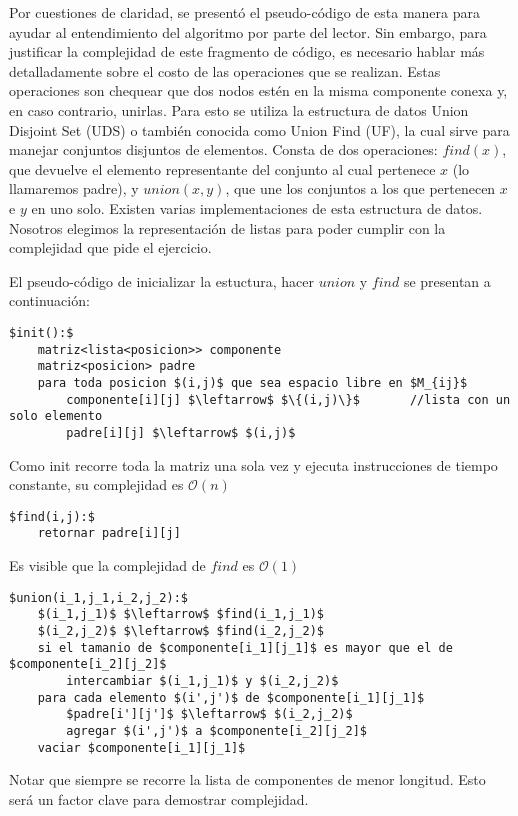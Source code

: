 Por cuestiones de claridad, se presentó el pseudo-código de esta manera para ayudar al entendimiento del algoritmo por parte del lector. Sin embargo, para justificar la complejidad de este fragmento de código, es necesario hablar más detalladamente sobre el costo de las operaciones que se realizan. Estas operaciones son chequear que dos nodos estén en la misma componente conexa y, en caso contrario, unirlas. Para esto se utiliza la estructura de datos Union Disjoint Set (UDS) o también conocida como Union Find (UF), la cual sirve para manejar conjuntos disjuntos de elementos. Consta de dos operaciones: $find(x)$, que devuelve el elemento representante del conjunto al cual pertenece $x$ (lo llamaremos padre), y $union(x,y)$, que une los conjuntos a los que pertenecen $x$ e $y$ en uno solo. Existen varias implementaciones de esta estructura de datos. Nosotros elegimos la representación de listas para poder cumplir con la complejidad que pide el ejercicio.

El pseudo-código de inicializar la estuctura, hacer $union$ y $find$ se presentan a continuación:

\begin{lstlisting}
$init():$
	matriz<lista<posicion>> componente
	matriz<posicion> padre
	para toda posicion $(i,j)$ que sea espacio libre en $M_{ij}$
		componente[i][j] $\leftarrow$ $\{(i,j)\}$		//lista con un solo elemento
		padre[i][j] $\leftarrow$ $(i,j)$
\end{lstlisting}

Como init recorre toda la matriz una sola vez y ejecuta instrucciones de tiempo constante, su complejidad es $\mathcal{O}(n)$

\begin{lstlisting}
$find(i,j):$
	retornar padre[i][j]
\end{lstlisting}

Es visible que la complejidad de $find$ es $\mathcal{O}(1)$

\begin{lstlisting}
$union(i_1,j_1,i_2,j_2):$
	$(i_1,j_1)$ $\leftarrow$ $find(i_1,j_1)$
	$(i_2,j_2)$ $\leftarrow$ $find(i_2,j_2)$
	si el tamanio de $componente[i_1][j_1]$ es mayor que el de $componente[i_2][j_2]$
		intercambiar $(i_1,j_1)$ y $(i_2,j_2)$
	para cada elemento $(i',j')$ de $componente[i_1][j_1]$
		$padre[i'][j']$ $\leftarrow$ $(i_2,j_2)$
		agregar $(i',j')$ a $componente[i_2][j_2]$
	vaciar $componente[i_1][j_1]$
\end{lstlisting}

Notar que siempre se recorre la lista de componentes de menor longitud. Esto será un factor clave para demostrar complejidad.

